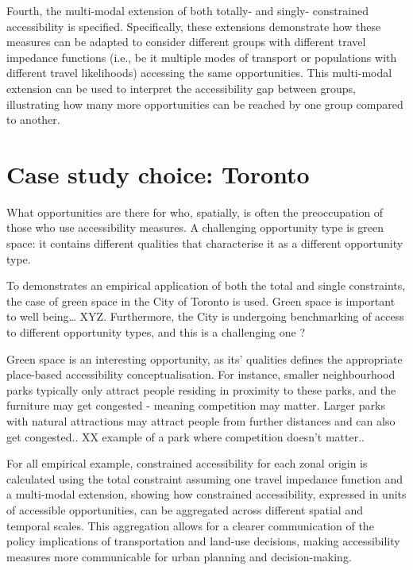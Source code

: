\documentclass[
11pt, %
oneside, %
english, %
singlespacing, %
]{macthesis} %
\begin{document}
Fourth, the multi-modal extension of both totally- and singly- constrained accessibility is specified. Specifically, these extensions demonstrate how these measures can be adapted to consider different groups with different travel impedance functions (i.e., be it multiple modes of transport or populations with different travel likelihoods) accessing the same opportunities. This multi-modal extension can be used to interpret the accessibility gap between groups, illustrating how many more opportunities can be reached by one group compared to another.

\section{Case study choice: Toronto}\label{case-study-choice-toronto}

What opportunities are there for who, spatially, is often the preoccupation of those who use accessibility measures. A challenging opportunity type is green space: it contains different qualities that characterise it as a different opportunity type.

To demonstrates an empirical application of both the total and single constraints, the case of green space in the City of Toronto is used. Green space is important to well being\ldots{} XYZ. Furthermore, the City is undergoing benchmarking of access to different opportunity types, and this is a challenging one ?

Green space is an interesting opportunity, as its' qualities defines the appropriate place-based accessibility conceptualisation. For instance, smaller neighbourhood parks typically only attract people residing in proximity to these parks, and the furniture may get congested - meaning competition may matter. Larger parks with natural attractions may attract people from further distances and can also get congested.. XX example of a park where competition doesn't matter..

For all empirical example, constrained accessibility for each zonal origin is calculated using the total constraint assuming one travel impedance function and a multi-modal extension, showing how constrained accessibility, expressed in units of accessible opportunities, can be aggregated across different spatial and temporal scales. This aggregation allows for a clearer communication of the policy implications of transportation and land-use decisions, making accessibility measures more communicable for urban planning and decision-making.
\end{document}
